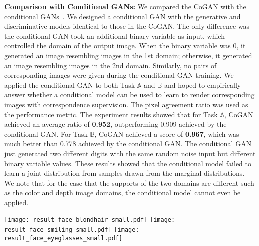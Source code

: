 \documentclass{article}
\begin{document}
{\bf Comparison with Conditional GANs:} We compared the CoGAN with the conditional GANs~\cite{mirza2014conditional}. We designed a conditional GAN with the generative and discriminative models identical to those in the CoGAN. The only difference was the conditional GAN took an additional binary variable as input, which controlled the domain of the output image. When the binary variable was 0, it generated an image resembling images in the 1st domain; otherwise, it generated an image resembling images in the 2nd domain. Similarly, no pairs of corresponding images were given during the conditional GAN training. We applied the conditional GAN to both Task  $\mathbb{A}$ and $\mathbb{B}$ and hoped to empirically answer whether a conditional model can be used to learn to render corresponding images with correspondence supervision. The pixel agreement ratio was used as the performance metric. The experiment results showed that for Task $\mathbb{A}$, CoGAN achieved an average ratio of {\bf 0.952}, outperforming 0.909 achieved by the conditional GAN. For Task $\mathbb{B}$, CoGAN achieved a score of {\bf 0.967}, which was much better than 0.778 achieved by the conditional GAN. The conditional GAN just generated two different digits with the same random noise input but different binary variable values. These results showed that the conditional model failed to learn a joint distribution from samples drawn from the marginal distributions. We note that for the case that the supports of the two domains are different such as the color and depth image domains, the conditional model cannot even be applied. 

\begin{figure*}[thb!]
\centering
\texttt{[image: result\_face\_blondhair\_small.pdf]}
\texttt{[image: result\_face\_smiling\_small.pdf]}
\texttt{[image: result\_face\_eyeglasses\_small.pdf]}
\caption{\small Generation of face images with different attributes using CoGAN. From top to bottom, the figure shows pair face generation results for the blond-hair, smiling, and eyeglasses attributes. For each pair, the 1st row contains faces with the attribute, while the 2nd row contains corresponding faces without the attribute.}
\label{fig::result_attr_faces}
\vspace{-2mm}
\end{figure*}
\end{document}
